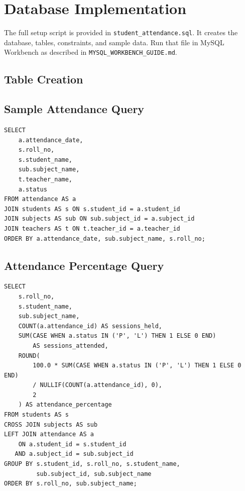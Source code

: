 \documentclass[12pt,a4paper]{report}
\begin{document}
\chapter{Database Implementation}
The full setup script is provided in \texttt{student\_attendance.sql}. It creates the database, tables, constraints, and sample data. Run that file in MySQL Workbench as described in \texttt{MYSQL\_WORKBENCH\_GUIDE.md}.

\section{Table Creation}


\section{Sample Attendance Query}
\begin{lstlisting}[style=sqlstyle, caption={Joining attendance to student, subject, and teacher details}]
SELECT
    a.attendance_date,
    s.roll_no,
    s.student_name,
    sub.subject_name,
    t.teacher_name,
    a.status
FROM attendance AS a
JOIN students AS s ON s.student_id = a.student_id
JOIN subjects AS sub ON sub.subject_id = a.subject_id
JOIN teachers AS t ON t.teacher_id = a.teacher_id
ORDER BY a.attendance_date, sub.subject_name, s.roll_no;
\end{lstlisting}

\section{Attendance Percentage Query}
\begin{lstlisting}[style=sqlstyle, caption={Percentage per student and subject; late marks count as attended}]
SELECT
    s.roll_no,
    s.student_name,
    sub.subject_name,
    COUNT(a.attendance_id) AS sessions_held,
    SUM(CASE WHEN a.status IN ('P', 'L') THEN 1 ELSE 0 END)
        AS sessions_attended,
    ROUND(
        100.0 * SUM(CASE WHEN a.status IN ('P', 'L') THEN 1 ELSE 0 END)
        / NULLIF(COUNT(a.attendance_id), 0),
        2
    ) AS attendance_percentage
FROM students AS s
CROSS JOIN subjects AS sub
LEFT JOIN attendance AS a
    ON a.student_id = s.student_id
   AND a.subject_id = sub.subject_id
GROUP BY s.student_id, s.roll_no, s.student_name,
         sub.subject_id, sub.subject_name
ORDER BY s.roll_no, sub.subject_name;
\end{lstlisting}
\end{document}
